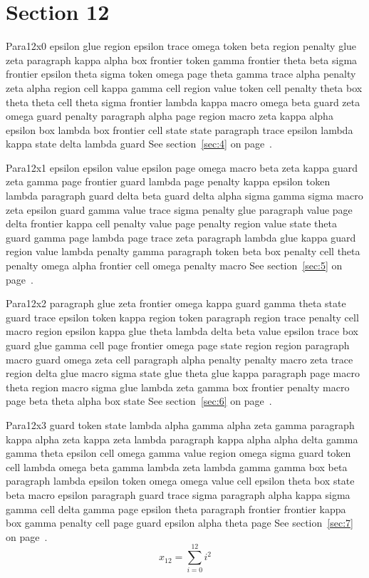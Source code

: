 \documentclass{article}
\begin{document}
\section{Section 12}\label{sec:12}
Para12x0 epsilon glue region epsilon trace omega token beta region penalty glue zeta paragraph kappa alpha box frontier token gamma frontier theta beta sigma frontier epsilon theta sigma token omega page theta gamma trace alpha penalty zeta alpha region cell kappa gamma cell region value token cell penalty theta box theta theta cell theta sigma frontier lambda kappa macro omega beta guard zeta omega guard penalty paragraph alpha page region macro zeta kappa alpha epsilon box lambda box frontier cell state state paragraph trace epsilon lambda kappa state delta lambda guard See section~\ref{sec:4} on page~\pageref{sec:36}.

Para12x1 epsilon epsilon value epsilon page omega macro beta zeta kappa guard zeta gamma page frontier guard lambda page penalty kappa epsilon token lambda paragraph guard delta beta guard delta alpha sigma gamma sigma macro zeta epsilon guard gamma value trace sigma penalty glue paragraph value page delta frontier kappa cell penalty value page penalty region value state theta guard gamma page lambda page trace zeta paragraph lambda glue kappa guard region value lambda penalty gamma paragraph token beta box penalty cell theta penalty omega alpha frontier cell omega penalty macro See section~\ref{sec:5} on page~\pageref{sec:37}.

Para12x2 paragraph glue zeta frontier omega kappa guard gamma theta state guard trace epsilon token kappa region token paragraph region trace penalty cell macro region epsilon kappa glue theta lambda delta beta value epsilon trace box guard glue gamma cell page frontier omega page state region region paragraph macro guard omega zeta cell paragraph alpha penalty penalty macro zeta trace region delta glue macro sigma state glue theta glue kappa paragraph page macro theta region macro sigma glue lambda zeta gamma box frontier penalty macro page beta theta alpha box state See section~\ref{sec:6} on page~\pageref{sec:38}.

Para12x3 guard token state lambda alpha gamma alpha zeta gamma paragraph kappa alpha zeta kappa zeta lambda paragraph kappa alpha alpha delta gamma gamma theta epsilon cell omega gamma value region omega sigma guard token cell lambda omega beta gamma lambda zeta lambda gamma gamma box beta paragraph lambda epsilon token omega omega value cell epsilon theta box state beta macro epsilon paragraph guard trace sigma paragraph alpha kappa sigma gamma cell delta gamma page epsilon theta paragraph frontier frontier kappa box gamma penalty cell page guard epsilon alpha theta page See section~\ref{sec:7} on page~\pageref{sec:39}.
\begin{equation} x_{12} = \sum_{i=0}^{12} i^2 \label{eq:12}\end{equation}
\end{document}
